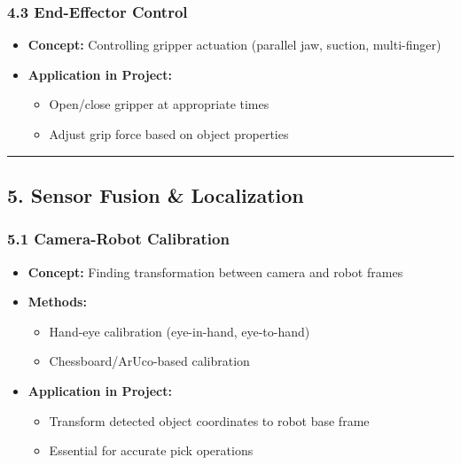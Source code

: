 \documentclass[
]{article}
\providecommand{\tightlist}{%
  \setlength{\itemsep}{0pt}\setlength{\parskip}{0pt}}
\begin{document}
\hypertarget{end-effector-control}{%
\subsubsection{4.3 End-Effector Control}\label{end-effector-control}}

\begin{itemize}
\tightlist
\item
  \textbf{Concept:} Controlling gripper actuation (parallel jaw,
  suction, multi-finger)
\item
  \textbf{Application in Project:}

  \begin{itemize}
  \tightlist
  \item
    Open/close gripper at appropriate times
  \item
    Adjust grip force based on object properties
  \end{itemize}
\end{itemize}

\begin{center}\rule{0.5\linewidth}{0.5pt}\end{center}

\hypertarget{sensor-fusion-localization}{%
\subsection{5. Sensor Fusion \&
Localization}\label{sensor-fusion-localization}}

\hypertarget{camera-robot-calibration}{%
\subsubsection{5.1 Camera-Robot
Calibration}\label{camera-robot-calibration}}

\begin{itemize}
\tightlist
\item
  \textbf{Concept:} Finding transformation between camera and robot
  frames
\item
  \textbf{Methods:}

  \begin{itemize}
  \tightlist
  \item
    Hand-eye calibration (eye-in-hand, eye-to-hand)
  \item
    Chessboard/ArUco-based calibration
  \end{itemize}
\item
  \textbf{Application in Project:}

  \begin{itemize}
  \tightlist
  \item
    Transform detected object coordinates to robot base frame
  \item
    Essential for accurate pick operations
  \end{itemize}
\end{itemize}
\end{document}
